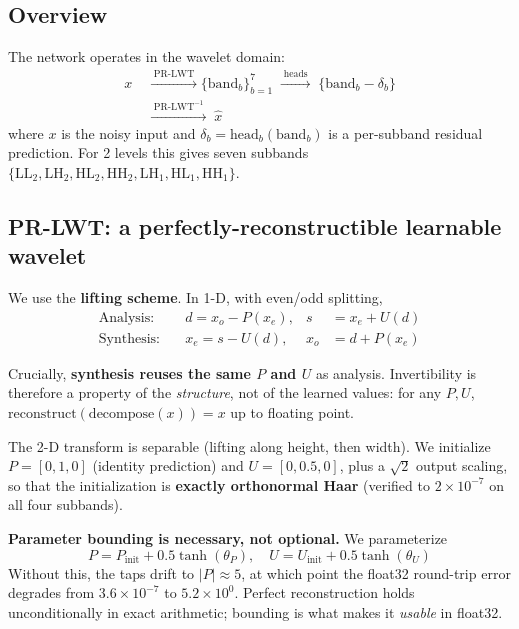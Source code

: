 \documentclass[conference]{IEEEtran}
\begin{document}
\subsection{Overview}
The network operates in the wavelet domain:
\begin{equation}
\begin{aligned}
x &\;\xrightarrow{\;\text{PR-LWT}\;}
     \{\text{band}_b\}_{b=1}^{7}
     \;\xrightarrow{\;\text{heads}\;}\; \{\text{band}_b - \delta_b\}\\
  &\;\xrightarrow{\;\text{PR-LWT}^{-1}\;}\; \hat{x}
\end{aligned}
\end{equation}
where $x$ is the noisy input and $\delta_b = \text{head}_b(\text{band}_b)$ is a
per-subband residual prediction. For 2 levels this gives seven subbands
$\{\mathrm{LL}_2,\mathrm{LH}_2,\mathrm{HL}_2,\mathrm{HH}_2,\mathrm{LH}_1,%
\mathrm{HL}_1,\mathrm{HH}_1\}$.

\subsection{PR-LWT: a perfectly-reconstructible learnable wavelet}
\label{sec:prlwt}

We use the \textbf{lifting scheme}. In 1-D, with even/odd splitting,
\begin{equation}
\begin{aligned}
\text{Analysis:}\quad & d = x_o - P(x_e), & s &= x_e + U(d)\\
\text{Synthesis:}\quad & x_e = s - U(d), & x_o &= d + P(x_e)
\end{aligned}
\end{equation}

Crucially, \textbf{synthesis reuses the same $P$ and $U$} as analysis.
Invertibility is therefore a property of the \emph{structure}, not of the
learned values: for any $P,U$,
$\text{reconstruct}(\text{decompose}(x)) = x$ up to floating point.

The 2-D transform is separable (lifting along height, then width). We initialize
$P=[0,1,0]$ (identity prediction) and $U=[0,0.5,0]$, plus a $\sqrt{2}$ output
scaling, so that the initialization is \textbf{exactly orthonormal Haar}
(verified to $2\times10^{-7}$ on all four subbands).

\textbf{Parameter bounding is necessary, not optional.} We parameterize
\begin{equation}
P = P_{\text{init}} + 0.5\tanh(\theta_P),\quad
U = U_{\text{init}} + 0.5\tanh(\theta_U)
\end{equation}
Without this, the taps drift to $|P|\approx5$, at which point the float32
round-trip error degrades from $3.6\times10^{-7}$ to $5.2\times10^{0}$. Perfect
reconstruction holds unconditionally in exact arithmetic; bounding is what makes
it \emph{usable} in float32.
\end{document}
